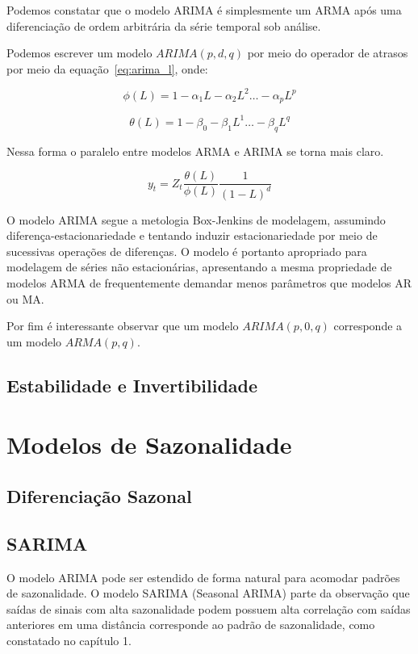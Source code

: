 Podemos constatar que o modelo ARIMA é simplesmente um ARMA após uma
diferenciação de ordem arbitrária da série temporal sob análise.

Podemos escrever um modelo $ARIMA(p, d, q)$ por meio do operador de atrasos
por meio da equação~\ref{eq:arima_l}, onde:

$$\phi(L) = 1 - \alpha_1 L - \alpha_2 L^2 \hdots - \alpha_p L^p$$

$$\theta(L) = 1 - \beta_0 - \beta_1 L^1 \hdots - \beta_q L^q$$

Nessa forma o paralelo entre modelos ARMA e ARIMA se torna mais claro.

\begin{equation}\label{eq:arima_l}
    y_t = Z_t \frac{\theta(L)}{\phi(L)} \frac{1}{(1-L)^d}
\end{equation}

O modelo ARIMA segue a metologia Box-Jenkins de modelagem, assumindo
diferença-estacionariedade e tentando induzir estacionariedade por meio de
sucessivas operações de diferenças. O modelo é portanto apropriado para
modelagem de séries não estacionárias, apresentando a mesma propriedade de
modelos ARMA de frequentemente demandar menos parâmetros que modelos AR ou MA.

Por fim é interessante observar que um modelo $ARIMA(p, 0, q)$ corresponde
a um modelo $ARMA(p, q)$.

\subsection{Estabilidade e Invertibilidade}
\label{ssec:stability_invertibility}

\section{Modelos de Sazonalidade}

\subsection{Diferenciação Sazonal}

\subsection{SARIMA}\label{ssec:SARIMA}

O modelo ARIMA pode ser estendido de forma natural para acomodar padrões de
sazonalidade. O modelo SARIMA (Seasonal ARIMA) parte da observação que saídas
de sinais com alta sazonalidade podem possuem alta correlação com saídas
anteriores em uma distância corresponde ao padrão de sazonalidade, como
constatado no capítulo 1.

